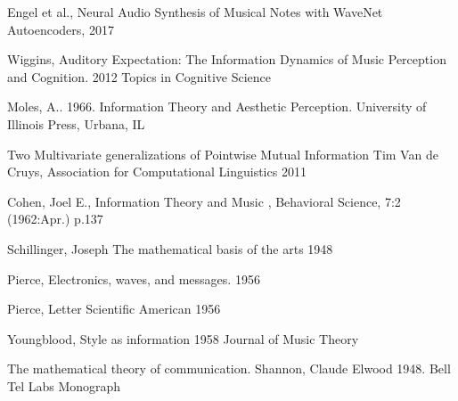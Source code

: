 \documentclass[final,authoryear,5p,times,twocolumn]{elsarticle}
\begin{document}
Engel et al., Neural Audio Synthesis of Musical Notes with WaveNet Autoencoders, 2017

Wiggins, Auditory Expectation: The Information Dynamics of Music Perception and Cognition. 2012 Topics in Cognitive Science

Moles, A.. 1966. Information Theory and Aesthetic Perception. University of Illinois Press, Urbana, IL

Two Multivariate generalizations of Pointwise Mutual Information Tim Van de Cruys, Association for Computational Linguistics 2011

Cohen, Joel E., Information Theory and Music , Behavioral Science, 7:2 (1962:Apr.) p.137

Schillinger, Joseph The mathematical basis of the arts 1948

Pierce, Electronics, waves, and messages. 1956

Pierce, Letter Scientific American 1956

Youngblood, Style as information 1958 Journal of Music Theory

The mathematical theory of communication. Shannon, Claude Elwood 1948. Bell Tel Labs Monograph



\end{document}
